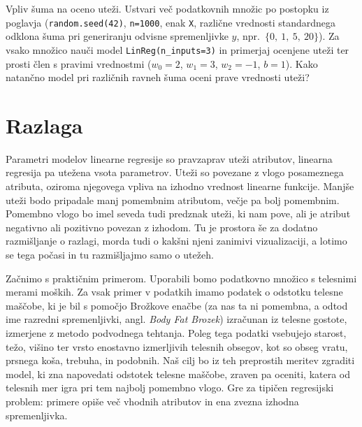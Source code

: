 \begin{exercise}{Vpliv šuma na oceno uteži.}
Ustvari več podatkovnih množic po postopku iz poglavja (\texttt{random.seed(42)}, \texttt{n=1000}, enak \texttt{X}, različne vrednosti standardnega odklona šuma pri generiranju odvisne spremenljivke $y$, npr.\ $\{0,\ 1,\ 5,\ 20\}$). Za vsako množico nauči model \texttt{LinReg(n\_inputs=3)} in primerjaj ocenjene uteži ter prosti člen s pravimi vrednostmi ($w_0=2$, $w_1=3$, $w_2=-1$, $b=1$). Kako natančno model pri različnih ravneh šuma oceni prave vrednosti uteži?
\end{exercise}

\section{Razlaga}

Parametri modelov linearne regresije so pravzaprav uteži atributov, linearna regresija pa utežena vsota parametrov. Uteži so povezane z vlogo posameznega atributa, oziroma njegovega vpliva na izhodno vrednost linearne funkcije. Manjše uteži bodo pripadale manj pomembnim atributom, večje pa bolj pomembnim. Pomembno vlogo bo imel seveda tudi predznak uteži, ki nam pove, ali je atribut negativno ali pozitivno povezan z izhodom. Tu je prostora še za dodatno razmišljanje o razlagi, morda tudi o kakšni njeni zanimivi vizualizaciji, a lotimo se tega počasi in tu razmišljajmo samo o utežeh.

Začnimo s praktičnim primerom. Uporabili bomo podatkovno množico s telesnimi merami moških. Za vsak primer v podatkih imamo podatek o odstotku telesne maščobe, ki je bil s pomočjo Brožkove enačbe (za nas ta ni pomembna, a odtod ime razredni spremenljivki, angl. {\em Body Fat Brozek}) izračunan iz telesne gostote, izmerjene z metodo podvodnega tehtanja. Poleg tega podatki vsebujejo starost, težo, višino ter vrsto enostavno izmerljivih telesnih obsegov, kot so obseg vratu, prsnega koša, trebuha, in podobnih. Naš cilj bo iz teh preprostih meritev zgraditi model, ki zna napovedati odstotek telesne maščobe, zraven pa oceniti, katera od telesnih mer igra pri tem najbolj pomembno vlogo. Gre za tipičen regresijski problem: primere opiše več vhodnih atributov in ena zvezna izhodna spremenljivka.

